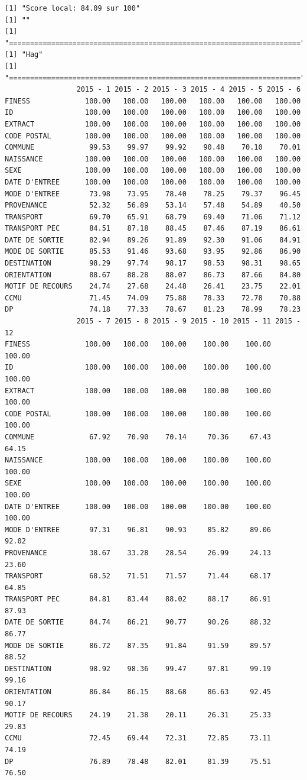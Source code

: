 \documentclass[]{article}
\begin{document}
\begin{verbatim}
[1] "Score local: 84.09 sur 100"
[1] ""
[1] "====================================================================="
[1] "Hag"
[1] "====================================================================="
                 2015 - 1 2015 - 2 2015 - 3 2015 - 4 2015 - 5 2015 - 6
FINESS             100.00   100.00   100.00   100.00   100.00   100.00
ID                 100.00   100.00   100.00   100.00   100.00   100.00
EXTRACT            100.00   100.00   100.00   100.00   100.00   100.00
CODE POSTAL        100.00   100.00   100.00   100.00   100.00   100.00
COMMUNE             99.53    99.97    99.92    90.48    70.10    70.01
NAISSANCE          100.00   100.00   100.00   100.00   100.00   100.00
SEXE               100.00   100.00   100.00   100.00   100.00   100.00
DATE D'ENTREE      100.00   100.00   100.00   100.00   100.00   100.00
MODE D'ENTREE       73.98    73.95    78.40    78.25    79.37    96.45
PROVENANCE          52.32    56.89    53.14    57.48    54.89    40.50
TRANSPORT           69.70    65.91    68.79    69.40    71.06    71.12
TRANSPORT PEC       84.51    87.18    88.45    87.46    87.19    86.61
DATE DE SORTIE      82.94    89.26    91.89    92.30    91.06    84.91
MODE DE SORTIE      85.53    91.46    93.68    93.95    92.86    86.90
DESTINATION         98.29    97.74    98.17    98.53    98.31    98.65
ORIENTATION         88.67    88.28    88.07    86.73    87.66    84.80
MOTIF DE RECOURS    24.74    27.68    24.48    26.41    23.75    22.01
CCMU                71.45    74.09    75.88    78.33    72.78    70.88
DP                  74.18    77.33    78.67    81.23    78.99    78.23
                 2015 - 7 2015 - 8 2015 - 9 2015 - 10 2015 - 11 2015 - 12
FINESS             100.00   100.00   100.00    100.00    100.00    100.00
ID                 100.00   100.00   100.00    100.00    100.00    100.00
EXTRACT            100.00   100.00   100.00    100.00    100.00    100.00
CODE POSTAL        100.00   100.00   100.00    100.00    100.00    100.00
COMMUNE             67.92    70.90    70.14     70.36     67.43     64.15
NAISSANCE          100.00   100.00   100.00    100.00    100.00    100.00
SEXE               100.00   100.00   100.00    100.00    100.00    100.00
DATE D'ENTREE      100.00   100.00   100.00    100.00    100.00    100.00
MODE D'ENTREE       97.31    96.81    90.93     85.82     89.06     92.02
PROVENANCE          38.67    33.28    28.54     26.99     24.13     23.60
TRANSPORT           68.52    71.51    71.57     71.44     68.17     64.85
TRANSPORT PEC       84.81    83.44    88.02     88.17     86.91     87.93
DATE DE SORTIE      84.74    86.21    90.77     90.26     88.32     86.77
MODE DE SORTIE      86.72    87.35    91.84     91.59     89.57     88.52
DESTINATION         98.92    98.36    99.47     97.81     99.19     99.16
ORIENTATION         86.84    86.15    88.68     86.63     92.45     90.17
MOTIF DE RECOURS    24.19    21.38    20.11     26.31     25.33     29.83
CCMU                72.45    69.44    72.31     72.85     73.11     74.19
DP                  76.89    78.48    82.01     81.39     75.51     76.50
\end{verbatim}
\end{document}
